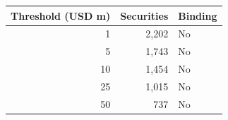 \begin{tabular}{@{}rrl@{}}
\toprule
Threshold (USD m) & Securities & Binding \\
\midrule
1 & 2,202 & No \\
5 & 1,743 & No \\
10 & 1,454 & No \\
25 & 1,015 & No \\
50 & 737 & No \\
\bottomrule
\end{tabular}
